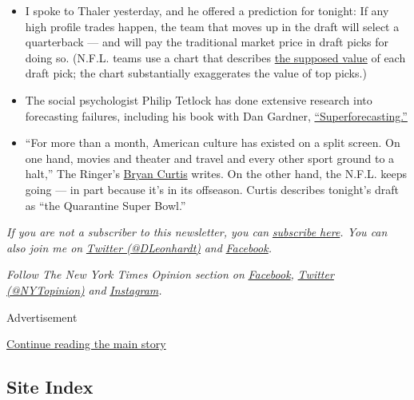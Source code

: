 \begin{itemize}
\item
  I spoke to Thaler yesterday, and he offered a prediction for tonight:
  If any high profile trades happen, the team that moves up in the draft
  will select a quarterback --- and will pay the traditional market
  price in draft picks for doing so. (N.F.L. teams use a chart that
  describes
  \href{https://www.pro-football-reference.com/draft/draft_trade_value.htm}{the
  supposed value} of each draft pick; the chart substantially
  exaggerates the value of top picks.)
\item
  The social psychologist Philip Tetlock has done extensive research
  into forecasting failures, including his book with Dan Gardner,
  \href{https://www.penguinrandomhouse.com/books/227815/superforecasting-by-philip-e-tetlock-and-dan-gardner/}{``Superforecasting.''}
\item
  ``For more than a month, American culture has existed on a split
  screen. On one hand, movies and theater and travel and every other
  sport ground to a halt,'' The Ringer's
  \href{https://www.theringer.com/2020/4/22/21230568/nfl-draft-quarantine-super-bowl-sports-media}{Bryan
  Curtis} writes. On the other hand, the N.F.L. keeps going --- in part
  because it's in its offseason. Curtis describes tonight's draft as
  ``the Quarantine Super Bowl.''
\end{itemize}

\emph{If you are not a subscriber to this newsletter, you can}
\href{https://www.nytimes.com/newsletters/david-leonhardt}{\emph{subscribe
here}}\emph{. You can also join me on}
\href{https://twitter.com/DLeonhardt}{\emph{Twitter (@DLeonhardt)}}
\emph{and}
\href{https://www.facebook.com/DavidRLeonhardt/}{\emph{Facebook}}\emph{.}

\emph{Follow The New York Times Opinion section on}
\href{https://www.facebook.com/nytopinion}{\emph{Facebook}}\emph{,}
\href{http://twitter.com/NYTOpinion}{\emph{Twitter (@NYTopinion)}}
\emph{and}
\href{https://www.instagram.com/nytopinion/}{\emph{Instagram}}\emph{.}

Advertisement

\protect\hyperlink{after-bottom}{Continue reading the main story}

\hypertarget{site-index}{%
\subsection{Site Index}\label{site-index}}

